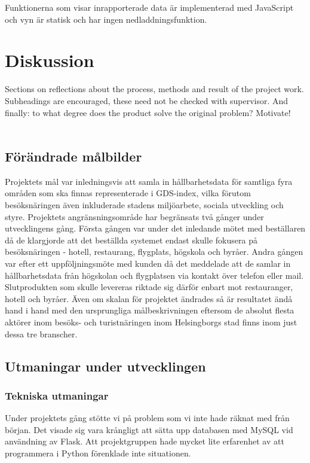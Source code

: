 \documentclass[12pt]{article}
\begin{document}
Funktionerna som visar inrapporterade data är implementerad med JavaScript och vyn är statisk och har ingen nedladdningsfunktion.

\section{Diskussion}
Sections on reflections about the process, methods and result of the project work. Subheadings are encouraged, these need not be checked with supervisor. And finally: to what degree does the product solve the original problem? Motivate!\\\\
\subsection{Förändrade målbilder}

Projektets mål var inledningsvis att samla in hållbarhetsdata för samtliga fyra områden som ska finnas representerade i GDS-index, vilka förutom besöksnäringen även inkluderade stadens miljöarbete, sociala utveckling och styre. Projektets angränsningsområde har begränsats två gånger under utvecklingens gång. Första gången var under det inledande mötet med beställaren då de klargjorde att det beställda systemet endast skulle fokusera på besöksnäringen - hotell, restaurang, flygplats, högskola och byråer. Andra gången var efter ett uppföljningsmöte med kunden då det meddelade att de samlar in hållbarhetsdata från högskolan och flygplatsen via kontakt över telefon eller mail. Slutprodukten som skulle levereras riktade sig därför enbart mot restauranger, hotell och byråer. Även om skalan för projektet ändrades så är resultatet ändå hand i hand med den ursprungliga målbeskrivningen eftersom de absolut flesta aktörer inom besöks- och turistnäringen inom Helsingborgs stad finns inom just dessa tre branscher.


\subsection{Utmaningar under utvecklingen}

\subsubsection{Tekniska utmaningar}
Under projektets gång stötte vi på problem som vi inte hade räknat med från början. Det visade sig vara krångligt att sätta upp databasen med MySQL vid användning av Flask. Att projektgruppen hade mycket lite erfarenhet av att programmera i Python förenklade inte situationen.  
\end{document}
